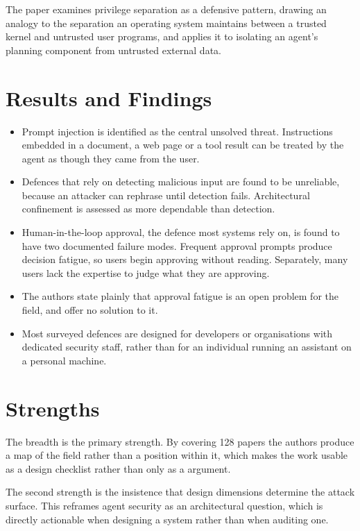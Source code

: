 \documentclass[11pt,a4paper]{article}
\begin{document}
The paper examines privilege separation as a defensive pattern, drawing an
analogy to the separation an operating system maintains between a trusted
kernel and untrusted user programs, and applies it to isolating an agent's
planning component from untrusted external data.

\section{Results and Findings}

\begin{itemize}
  \item Prompt injection is identified as the central unsolved threat.
        Instructions embedded in a document, a web page or a tool result can be
        treated by the agent as though they came from the user.
  \item Defences that rely on detecting malicious input are found to be
        unreliable, because an attacker can rephrase until detection fails.
        Architectural confinement is assessed as more dependable than
        detection.
  \item Human-in-the-loop approval, the defence most systems rely on, is found
        to have two documented failure modes. Frequent approval prompts produce
        decision fatigue, so users begin approving without reading. Separately,
        many users lack the expertise to judge what they are approving.
  \item The authors state plainly that approval fatigue is an open problem for
        the field, and offer no solution to it.
  \item Most surveyed defences are designed for developers or organisations
        with dedicated security staff, rather than for an individual running an
        assistant on a personal machine.
\end{itemize}

\section{Strengths}

The breadth is the primary strength. By covering 128 papers the authors produce
a map of the field rather than a position within it, which makes the work
usable as a design checklist rather than only as a argument.

The second strength is the insistence that design dimensions determine the
attack surface. This reframes agent security as an architectural question,
which is directly actionable when designing a system rather than when auditing
one.
\end{document}
